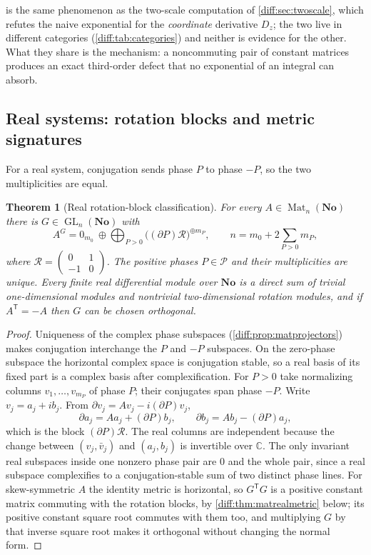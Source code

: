\documentclass[11pt,letterpaper]{article}
\numberwithin{equation}{section}
\newtheorem{theorem}{Theorem}[section]
\theoremstyle{definition}
\theoremstyle{remark}
\newcommand{\No}{\mathbf{No}}
\newcommand{\C}{\mathbb C}
\newcommand{\der}{\partial}
\newcommand{\Pcl}{\mathcal P}
\newcommand{\Dz}{D_{z}}
\newcommand{\Mat}{\operatorname{Mat}}
\newcommand{\GL}{\operatorname{GL}}
\newcommand{\Rot}{\mathcal R}
\begin{document}
 is the same phenomenon as the two-scale
computation of \cref{diff:sec:twoscale}, which refutes the naive exponential
for the \emph{coordinate} derivative $\Dz$; the two live in different
categories (\cref{diff:tab:categories}) and neither is evidence for the other.
What they share is the mechanism: a noncommuting pair of constant matrices
produces an exact third-order defect that no exponential of an integral can
absorb.

\subsection{Real systems: rotation blocks and metric signatures}
\label{diff:sub:matreal}

For a real system, conjugation sends phase $P$ to phase $-P$, so the two
multiplicities are equal.

\begin{theorem}[Real rotation-block classification]
\label{diff:thm:matreal}
For every $A\in\Mat_{n}(\No)$ there is $G\in\GL_{n}(\No)$ with
\begin{equation}\label{diff:eq:matrealnormal}
 A^{G}=0_{m_{0}}\ \oplus\bigoplus_{P>0}\bigl((\der P)\Rot\bigr)^{\oplus m_{P}},
 \qquad
 n=m_{0}+2\sum_{P>0}m_{P},
\end{equation}
where $\Rot=\left(\begin{smallmatrix}0&1\\-1&0\end{smallmatrix}\right)$. The
positive phases $P\in\Pcl$ and their multiplicities are unique. Every finite
real differential module over $\No$ is a direct sum of trivial
one-dimensional modules and nontrivial two-dimensional rotation modules, and
if $A^{\mathsf T}=-A$ then $G$ can be chosen orthogonal.
\end{theorem}
\begin{proof}
Uniqueness of the complex phase subspaces
(\cref{diff:prop:matprojectors}) makes conjugation interchange the $P$ and
$-P$ subspaces. On the zero-phase subspace the horizontal complex space is
conjugation stable, so a real basis of its fixed part is a complex basis after
complexification. For $P>0$ take normalizing columns
$v_{1},\dots,v_{m_{P}}$ of phase $P$; their conjugates span phase $-P$. Write
$v_{j}=a_{j}+ib_{j}$. From $\der v_{j}=Av_{j}-i(\der P)v_{j}$,
\[
 \der a_{j}=Aa_{j}+(\der P)b_{j},
 \qquad
 \der b_{j}=Ab_{j}-(\der P)a_{j},
\]
which is the block $(\der P)\Rot$. The real columns are independent because
the change between $(v_{j},\bar v_{j})$ and $(a_{j},b_{j})$ is invertible over
$\C$. The only invariant real subspaces inside one nonzero phase pair are $0$
and the whole pair, since a real subspace complexifies to a
conjugation-stable sum of two distinct phase lines. For skew-symmetric $A$ the
identity metric is horizontal, so $G^{\mathsf T}G$ is a positive constant matrix
commuting with the rotation blocks, by \cref{diff:thm:matrealmetric} below;
its positive constant square root commutes with them too, and multiplying $G$
by that inverse square root makes it orthogonal without changing the normal
form.
\end{proof}
\end{document}
